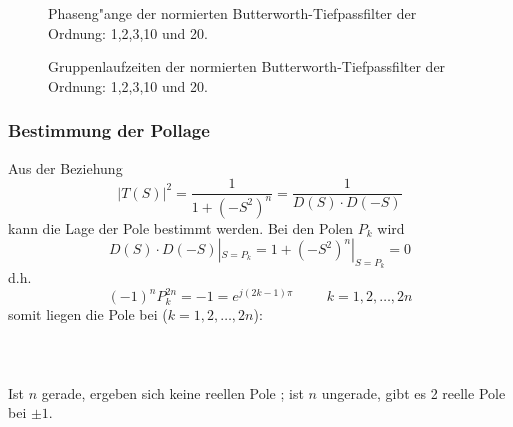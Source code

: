 \clearpage

\begin{figure}[!htb]%
\vspace*{-3mm}
\begin{center}
\vspace*{-2mm}\caption{Phaseng"ange der normierten Butterworth-Tiefpassfilter der Ordnung: 1,2,3,10 und 20.}
\end{center}
\vspace*{-6mm}
\end{figure}

\begin{figure}[!htb]%
\vspace*{-3mm}
\begin{center}
\vspace*{-2mm}\caption{Gruppenlaufzeiten der normierten Butterworth-Tiefpassfilter der Ordnung: 1,2,3,10 und 20.}
\end{center}
\vspace*{-6mm}
\end{figure}


\clearpage
\subsubsection{Bestimmung der Pollage}
Aus der Beziehung
\[
|T(S)|^{2}=\frac{1}{1+(-S^{2})^{n}}=\frac{1}{D(S) \cdot D(-S)}
\]
kann die Lage der Pole bestimmt werden.  Bei den Polen $P_{k}$ wird
\[
D(S) \cdot D(-S)|_{S=P_{k}}=1+(-S^{2})^{n}|_{S=P_{k}}=0
\]
d.h. 
\[
(-1)^{n} P_{k}^{2n}=-1=e^{j(2k-1)\pi} \hspace{1cm} k=1,2,\ldots, 2n
\]
somit liegen die Pole bei ($k=1,2,\ldots, 2n$):\\~~\\
\\~~\\
  Ist $n$
gerade, ergeben sich keine reellen Pole ; ist $n$ ungerade, gibt es 2
reelle Pole bei $\pm 1$.

